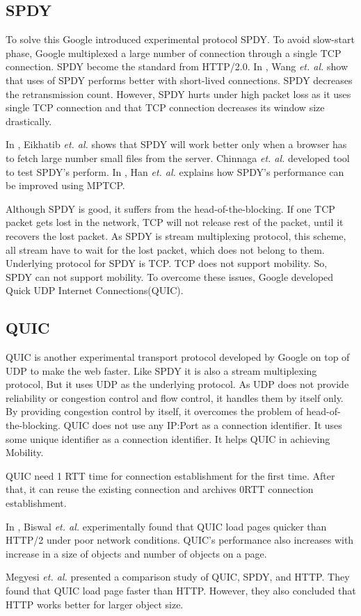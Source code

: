 \subsection{SPDY}
To solve this Google introduced experimental protocol SPDY\cite{spdy}. To avoid slow-start phase, Google multiplexed a large number of connection through a single TCP connection. SPDY become the standard from HTTP/2.0. In \cite{howspeedis}, Wang \textit{et. al.} show that uses of SPDY performs better with short-lived connections. SPDY decreases the retransmission count. However, SPDY hurts under high packet loss as it uses single TCP connection and that TCP connection decreases its window size drastically. 

In \cite{canspdymake}, Eikhatib \textit{et. al.} shows that SPDY will work better only when a browser has to fetch large number small files from the server. Chinnaga \textit{et. al.} developed tool to test SPDY's perform\cite{scalabilitySPDY}. In \cite{han2015anatomy}, Han \textit{et. al.} explains how SPDY's performance can be improved using MPTCP.

Although SPDY is good, it suffers from the head-of-the-blocking. If one TCP packet gets lost in the network, TCP will not release rest of the packet, until it recovers the lost packet. As SPDY is stream multiplexing protocol, this scheme, all stream have to wait for the lost packet, which does not belong to them. Underlying protocol for SPDY is TCP. TCP does not support mobility. So, SPDY can not support mobility. To overcome these issues, Google developed Quick UDP Internet Connections(QUIC).

\subsection{QUIC}
QUIC\cite{quic} is another experimental transport protocol developed by Google on top of UDP to make the web faster. Like SPDY it is also a stream multiplexing protocol, But it uses UDP as the underlying protocol. As UDP does not provide reliability or congestion control and flow control, it handles them by itself only. By providing congestion control by itself, it overcomes the problem of head-of-the-blocking. QUIC does not use any IP:Port as a connection identifier. It uses some unique identifier as a connection identifier. It helps QUIC in achieving Mobility.

QUIC need 1 RTT time for connection establishment for the first time. After that, it can reuse the existing connection and archives 0RTT connection establishment. 

In \cite{quicmakewebfast}, Biswal \textit{et. al.} experimentally found that QUIC load pages quicker than HTTP/2 under poor network conditions. QUIC's performance also increases with increase in a size of objects and number of objects on a page.

Megyesi \textit{et. al.} presented a comparison study of QUIC, SPDY, and HTTP\cite{quicisquic}. They found that QUIC load page faster than HTTP. However, they also concluded that HTTP works better for larger object size.